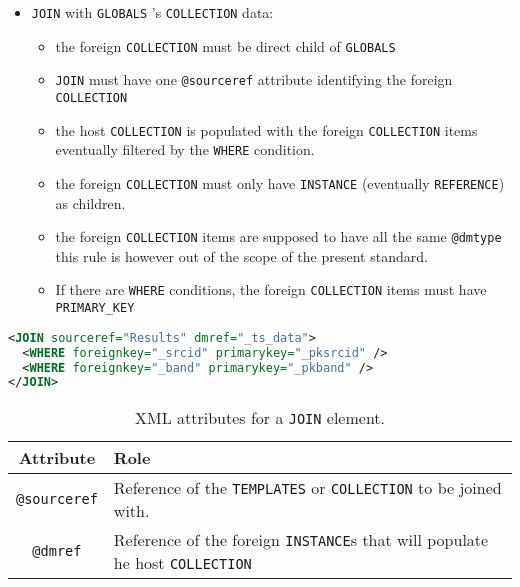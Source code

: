 \begin{itemize}
   \item \texttt{JOIN}  with \texttt{GLOBALS} 's \texttt{COLLECTION} data:
       \begin{itemize}
         \item the foreign \texttt{COLLECTION} must be direct child of \texttt{GLOBALS} 
         \item \texttt{JOIN} must have one \texttt{@sourceref} attribute identifying the foreign \texttt{COLLECTION} 
         \item the host \texttt{COLLECTION} is populated with the foreign \texttt{COLLECTION} items eventually filtered by the \texttt{WHERE} condition.
         \item the foreign \texttt{COLLECTION} must only have \texttt{INSTANCE}  (eventually \texttt{REFERENCE}) as children.
         \item the foreign \texttt{COLLECTION} items are supposed to have all the same \texttt{@dmtype}  this rule is however out of the scope of the present standard.
         \item If there are \texttt{WHERE} conditions, the foreign \texttt{COLLECTION} items must have \texttt{PRIMARY\_KEY} 
  \end{itemize}
\end{itemize}

\begin{lstlisting}[label={lst:join},caption={\texttt{JOIN example with 2 join conditions} },language=XML]
<JOIN sourceref="Results" dmref="_ts_data">
  <WHERE foreignkey="_srcid" primarykey="_pksrcid" />
  <WHERE foreignkey="_band" primarykey="_pkband" />
</JOIN>
\end{lstlisting}

\begin{table}[!htbp]
\small
\centering
\begin{tabulary}{\linewidth}{|c|J|}       
       \hline 
            \textbf{Attribute} & 
            \textbf {Role}\\
       \hline         \hline  
             \texttt{@sourceref} & 
            Reference of the \texttt{TEMPLATES} or \texttt{COLLECTION} to be joined with. \\
        \hline 
            \texttt{@dmref} & 
            Reference of the foreign \texttt{INSTANCE}s that will populate he host \texttt{COLLECTION}  \\
        \hline 
     \end{tabulary}
     \caption{XML attributes for a \texttt{JOIN} element.} 
     \label{tbl:join-att}
 \end{table}

